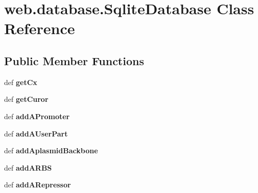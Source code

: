 \hypertarget{classweb_1_1database_1_1_sqlite_database}{\section{web.\-database.\-Sqlite\-Database Class Reference}
\label{classweb_1_1database_1_1_sqlite_database}
}
\subsection*{Public Member Functions}
\begin{DoxyCompactItemize}
\item 
\hypertarget{classweb_1_1database_1_1_sqlite_database_ad2a7f19f35678292548e0393cd825183}{def {\bfseries get\-Cx}}\label{classweb_1_1database_1_1_sqlite_database_ad2a7f19f35678292548e0393cd825183}

\item 
\hypertarget{classweb_1_1database_1_1_sqlite_database_ab72f9cbafeb06d8cff21a475ccdbebe3}{def {\bfseries get\-Curor}}\label{classweb_1_1database_1_1_sqlite_database_ab72f9cbafeb06d8cff21a475ccdbebe3}

\item 
\hypertarget{classweb_1_1database_1_1_sqlite_database_a4093cd2060b23664f975837e3e2c4254}{def {\bfseries add\-A\-Promoter}}\label{classweb_1_1database_1_1_sqlite_database_a4093cd2060b23664f975837e3e2c4254}

\item 
\hypertarget{classweb_1_1database_1_1_sqlite_database_a2a7d9ad306b7f3b4b565ac475ae5b1f4}{def {\bfseries add\-A\-User\-Part}}\label{classweb_1_1database_1_1_sqlite_database_a2a7d9ad306b7f3b4b565ac475ae5b1f4}

\item 
\hypertarget{classweb_1_1database_1_1_sqlite_database_ada2f619fce15f45b88b2d6731f76e01a}{def {\bfseries add\-Aplasmid\-Backbone}}\label{classweb_1_1database_1_1_sqlite_database_ada2f619fce15f45b88b2d6731f76e01a}

\item 
\hypertarget{classweb_1_1database_1_1_sqlite_database_a142721418384bd5c28a3a297e26b3982}{def {\bfseries add\-A\-R\-B\-S}}\label{classweb_1_1database_1_1_sqlite_database_a142721418384bd5c28a3a297e26b3982}

\item 
\hypertarget{classweb_1_1database_1_1_sqlite_database_ac5916b100f59267d3b82b091049dd339}{def {\bfseries add\-A\-Repressor}}\label{classweb_1_1database_1_1_sqlite_database_ac5916b100f59267d3b82b091049dd339}


\end{DoxyCompactItemize}
